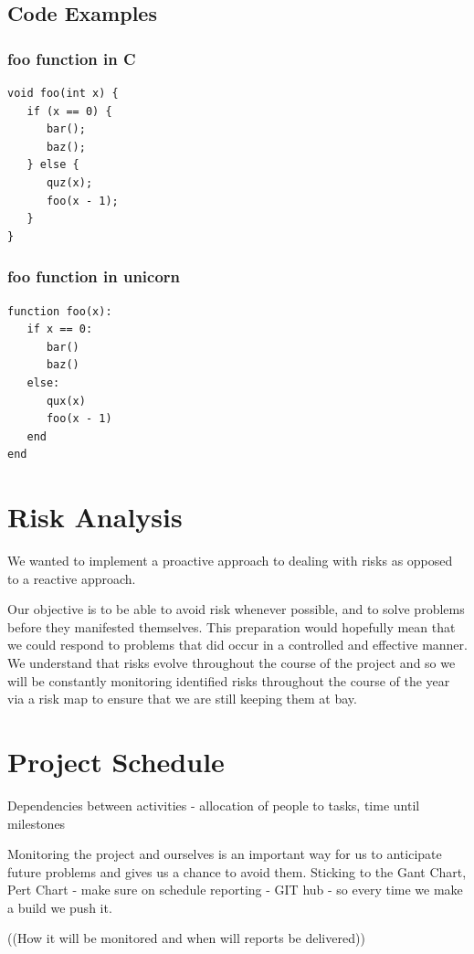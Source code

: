\documentclass[a4paper,11pt]{article}
\begin{document}
\subsection*{Code Examples}
\begin{multicols}{2}
\subsubsection*{foo function in C}
\begin{lstlisting}
void foo(int x) {
   if (x == 0) {
      bar();
      baz();
   } else {
      quz(x);
      foo(x - 1);
   }
}
\end{lstlisting}
\subsubsection*{foo function in unicorn}
\begin{lstlisting}
function foo(x):
   if x == 0:
      bar()
      baz()
   else:
      qux(x)
      foo(x - 1)
   end
end
\end{lstlisting}
\end{multicols}

\pagebreak
\section{Risk Analysis}

We wanted to implement a proactive approach to dealing with risks as opposed to a reactive approach.

Our objective is to be able to avoid risk whenever possible, and to solve problems before they manifested themselves. This preparation would hopefully mean that we could respond to problems that did occur in a controlled and effective manner. We understand that risks evolve throughout the course of the project and so we will be constantly monitoring identified risks throughout the course of the year via a risk map to ensure that we are still keeping them at bay. 

\section{Project Schedule}

Dependencies between activities - allocation of people to tasks, time until milestones

Monitoring the project and ourselves is an important way for us to anticipate future
problems and gives us a chance to avoid them.
Sticking to the Gant Chart, Pert Chart - make sure on schedule
reporting - GIT hub - so every time we make a build we push it.

((How it will be monitored and when will reports be delivered))
\end{document}
